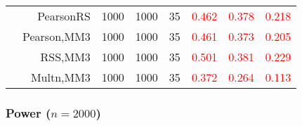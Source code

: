 \documentclass[
]{article}
\begin{document}
\begin{table}[H]
{\begin{tabular}[t]{lrrrrrrr}
\hspace{1em} & PearsonRS & 1000 & 1000 & 35 & \textcolor{red}{0.462} & \textcolor{red}{0.378} & \textcolor{red}{0.218}\\

\hspace{1em} & Pearson,MM3 & 1000 & 1000 & 35 & \textcolor{red}{0.461} & \textcolor{red}{0.373} & \textcolor{red}{0.205}\\

\hspace{1em} & RSS,MM3 & 1000 & 1000 & 35 & \textcolor{red}{0.501} & \textcolor{red}{0.381} & \textcolor{red}{0.229}\\

\hspace{1em} & Multn,MM3 & 1000 & 1000 & 35 & \textcolor{red}{0.372} & \textcolor{red}{0.264} & \textcolor{red}{0.113}\\
\bottomrule
\end{tabular}}
\endgroup{}
\end{table}

\hypertarget{power-n2000}{%
\subsubsection{\texorpdfstring{Power
(\(n=2000\))}{Power (n=2000)}}\label{power-n2000}}
\end{document}
